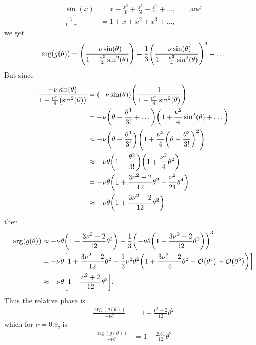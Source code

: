 \documentclass{article} %
\theoremstyle{plain}
\numberwithin{equation}{section} %
\numberwithin{figure}{section} %
\numberwithin{table}{section} %
\begin{document}
\begin{enumerate}[\ \ (a)]
\begin{align*}
            \sin(x) &= x - \frac{x^3}{3!} + \frac{x^5}{5!} - \frac{x^7}{7!} + \dots, \qquad \text{and} \\
            \frac{1}{1 - x} &= 1 + x + x^2 + x^3 + \dots,
        \end{align*}
        we get
        \begin{align*}
            \arg(g(\theta)) = \qty(\frac{-\nu\sin(\theta)}{1 - \frac{\nu^2}{4}\sin^2(\theta)}) - \frac{1}{3}\qty(\frac{-\nu\sin(\theta)}{1 - \frac{\nu^2}{4}\sin^2(\theta)})^3 + \dots
        \end{align*}
        But since
        \begin{align*}
            \frac{-\nu\sin(\theta)}{1 - \frac{\nu^2}{4}\qty(\sin^2(\theta))} &= \qty(-\nu\sin(\theta))\qty(\frac{1}{1 - \frac{\nu^2}{4}\sin^2(\theta)}) \\
            &= -\nu\qty(\theta - \frac{\theta^3}{3!} + \dots)\qty(1 + \frac{\nu^2}{4}\sin^2(\theta) + \dots) \\
            &\approx -\nu\qty(\theta - \frac{\theta^3}{3!})\qty(1 + \frac{\nu^2}{4}\qty(\theta - \frac{\theta^3}{3!})^2) \\
            &\approx -\nu\theta\qty(1 - \frac{\theta^2}{3!})\qty(1 + \frac{\nu^2}{4}\theta^2) \\
            &= -\nu\theta\qty(1 + \frac{3\nu^2 - 2}{12}\theta^2 - \frac{\nu^2}{24}\theta^4) \\
            &\approx -\nu\theta\qty(1 + \frac{3\nu^2 - 2}{12}\theta^2) \\
        \end{align*}
        then
        \begin{align*}
            \arg(g(\theta)) &\approx -\nu\theta\qty(1 + \frac{3\nu^2 - 2}{12}\theta^2) - \frac{1}{3}\qty(-\nu\theta\qty(1 + \frac{3\nu^2 - 2}{12}\theta^2))^3 \\
            &= -\nu\theta\qty[1 + \frac{3\nu^2 - 2}{12}\theta^2 - \frac{1}{3}\nu^2\theta^2\qty(1 + \frac{3\nu^2 - 2}{4}\theta^2 + \order{\theta^4} + \order{\theta^6})] \\
            &\approx -\nu\theta\qty[1 - \frac{\nu^2 + 2}{12}\theta^2].
        \end{align*}
        Thus the relative phase is
        \begin{align*}
            \frac{\arg(g(\theta))}{-\nu\theta} &= 1 - \frac{\nu^2 + 2}{12}\theta^2
        \end{align*}
        which for $\nu = 0.9$, is
        \begin{align*}
            \frac{\arg(g(\theta))}{-\nu\theta} &= 1 - \frac{2.81}{12}\theta^2

\end{align*}
\end{enumerate}
\end{document}
